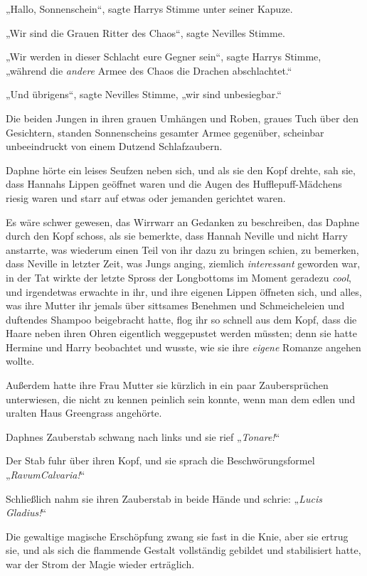 {„Hallo, Sonnenschein“, sagte Harrys Stimme unter seiner Kapuze.

„Wir sind die Grauen Ritter des Chaos“, sagte Nevilles Stimme.

„Wir werden in dieser Schlacht eure Gegner sein“, sagte Harrys Stimme, „während die \emph{andere} Armee des Chaos die Drachen abschlachtet.“

„Und übrigens“, sagte Nevilles Stimme, „wir sind unbesiegbar.“

Die beiden Jungen in ihren grauen Umhängen und Roben, graues Tuch über den Gesichtern, standen Sonnenscheins gesamter Armee gegenüber, scheinbar unbeeindruckt von einem Dutzend Schlafzaubern.

Daphne hörte ein leises Seufzen neben sich, und als sie den Kopf drehte, sah sie, dass Hannahs Lippen geöffnet waren und die Augen des Hufflepuff-Mädchens riesig waren und starr auf etwas oder jemanden gerichtet waren.

Es wäre schwer gewesen, das Wirrwarr an Gedanken zu beschreiben, das Daphne durch den Kopf schoss, als sie bemerkte, dass Hannah Neville und nicht Harry anstarrte, was wiederum einen Teil von ihr dazu zu bringen schien, zu bemerken, dass Neville in letzter Zeit, was Jungs anging, ziemlich \emph{interessant} geworden war, in der Tat wirkte der letzte Spross der Longbottoms im Moment geradezu \emph{cool}, und irgendetwas erwachte in ihr, und ihre eigenen Lippen öffneten sich, und alles, was ihre Mutter ihr jemals über sittsames Benehmen und Schmeicheleien und duftendes Shampoo beigebracht hatte, flog ihr so schnell aus dem Kopf, dass die Haare neben ihren Ohren eigentlich weggepustet werden müssten; denn sie hatte Hermine und Harry beobachtet und wusste, wie sie ihre \emph{eigene} Romanze angehen wollte.

Außerdem hatte ihre Frau Mutter sie kürzlich in ein paar Zaubersprüchen unterwiesen, die nicht zu kennen peinlich sein konnte, wenn man dem edlen und uralten Haus Greengrass angehörte.

Daphnes Zauberstab schwang nach links und sie rief „\emph{Tonare!}“

Der Stab fuhr über ihren Kopf, und sie sprach die Beschwörungsformel „\emph{RavumCalvaria!}“

Schließlich nahm sie ihren Zauberstab in beide Hände und schrie: „\emph{Lucis} \emph{Gladius!}“

Die gewaltige magische Erschöpfung zwang sie fast in die Knie, aber sie ertrug sie, und als sich die flammende Gestalt vollständig gebildet und stabilisiert hatte, war der Strom der Magie wieder erträglich.

}
